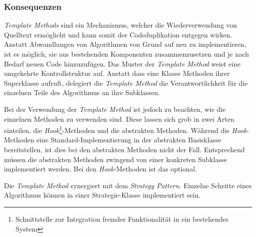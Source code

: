 \subsubsection*{Konsequenzen}

\emph{Template Methods} sind ein Mechanismus, welcher die Wiederverwendung von Quelltext ermöglicht und kann somit der Codeduplikation entgegen wirken. Anstatt Abwandlungen von Algorithmen von Grund auf neu zu implementieren, ist es möglich, sie aus bestehenden Komponenten zusammenzusetzen und je nach Bedarf neuen Code hinzuzufügen. Das Muster der \emph{Template Method} weist eine umgekehrte Kontrollstruktur auf. Anstatt dass eine Klasse Methoden ihrer Superklasse aufruft, delegiert die \emph{Template Method} die Verantwortlichkeit für die einzelnen Teile des Algorithmus an ihre Subklassen.

Bei der Verwendung der \emph{Template Method} ist jedoch zu beachten, wie die einzelnen Methoden zu verwenden sind. Diese lassen sich grob in zwei Arten einteilen, die \emph{Hook}\footnote{Schnittstelle zur Integration fremder Funktionalität in ein bestehendes System}-Methoden und die abstrakten Methoden. Während die \emph{Hook}-Methoden eine Standard-Implementierung in der abstrakten Basisklasse bereitstellen, ist dies bei den abstrakten Methoden nicht der Fall. Entsprechend müssen die abstrakten Methoden zwingend von einer konkreten Subklasse implementiert werden. Bei den \emph{Hook}-Methoden ist das optional.

Die \emph{Template Method} synergiert mit dem \emph{Strategy Pattern}. Einzelne Schritte eines Algorithmus können in einer Strategie-Klasse implementiert sein. \cite{gamma_design_1995}